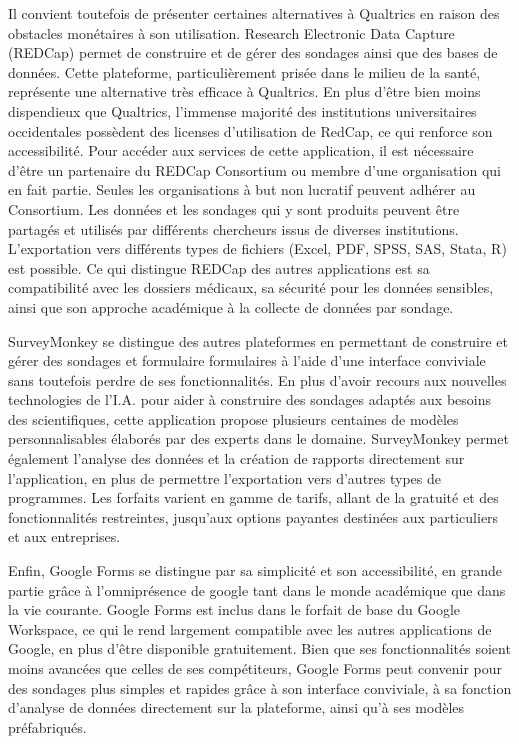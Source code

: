 \documentclass[
  letterpaper,
  DIV=11,
  numbers=noendperiod]{scrreprt}
\begin{document}
Il convient toutefois de présenter certaines alternatives à Qualtrics en
raison des obstacles monétaires à son utilisation. Research Electronic
Data Capture (REDCap) permet de construire et de gérer des sondages
ainsi que des bases de données. Cette plateforme, particulièrement
prisée dans le milieu de la santé, représente une alternative très
efficace à Qualtrics. En plus d'être bien moins dispendieux que
Qualtrics, l'immense majorité des institutions universitaires
occidentales possèdent des licenses d'utilisation de RedCap, ce qui
renforce son accessibilité. Pour accéder aux services de cette
application, il est nécessaire d'être un partenaire du REDCap Consortium
ou membre d'une organisation qui en fait partie. Seules les
organisations à but non lucratif peuvent adhérer au Consortium. Les
données et les sondages qui y sont produits peuvent être partagés et
utilisés par différents chercheurs issus de diverses institutions.
L'exportation vers différents types de fichiers (Excel, PDF, SPSS, SAS,
Stata, R) est possible. Ce qui distingue REDCap des autres applications
est sa compatibilité avec les dossiers médicaux, sa sécurité pour les
données sensibles, ainsi que son approche académique à la collecte de
données par sondage.

SurveyMonkey se distingue des autres plateformes en permettant de
construire et gérer des sondages et formulaire formulaires à l'aide
d'une interface conviviale sans toutefois perdre de ses fonctionnalités.
En plus d'avoir recours aux nouvelles technologies de l'I.A. pour aider
à construire des sondages adaptés aux besoins des scientifiques, cette
application propose plusieurs centaines de modèles personnalisables
élaborés par des experts dans le domaine. SurveyMonkey permet également
l'analyse des données et la création de rapports directement sur
l'application, en plus de permettre l'exportation vers d'autres types de
programmes. Les forfaits varient en gamme de tarifs, allant de la
gratuité et des fonctionnalités restreintes, jusqu'aux options payantes
destinées aux particuliers et aux entreprises.

Enfin, Google Forms se distingue par sa simplicité et son accessibilité,
en grande partie grâce à l'omniprésence de google tant dans le monde
académique que dans la vie courante. Google Forms est inclus dans le
forfait de base du Google Workspace, ce qui le rend largement compatible
avec les autres applications de Google, en plus d'être disponible
gratuitement. Bien que ses fonctionnalités soient moins avancées que
celles de ses compétiteurs, Google Forms peut convenir pour des sondages
plus simples et rapides grâce à son interface conviviale, à sa fonction
d'analyse de données directement sur la plateforme, ainsi qu'à ses
modèles préfabriqués.
\end{document}
